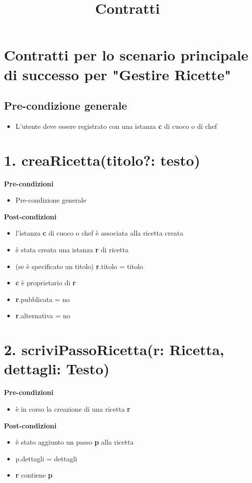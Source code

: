 \documentclass[12pt]{extarticle}
\begin{document}
\title{Contratti}
\date{}
\maketitle

\section*{Contratti per lo scenario principale di successo per "Gestire Ricette"}

\subsection*{Pre-condizione generale}
\begin{itemize}
  \item L'utente deve essere registrato con una istanza \textbf{c} di cuoco o di chef
\end{itemize}

\section*{1. creaRicetta(titolo?: testo)}
\textbf{Pre-condizioni}
\begin{itemize}
  \item Pre-condizione generale
\end{itemize}
\textbf{Post-condizioni}
\begin{itemize}
  \item l'istanza \textbf{c} di cuoco o chef è associata alla ricetta creata
  \item è stata creata una istanza \textbf{r} di ricetta
  \item (se è specificato un titolo) \textbf{r}.titolo = titolo
  \item \textbf{c} è proprietario di \textbf{r}
  \item \textbf{r}.pubblicata = no
  \item \textbf{r}.alternativa = no
\end{itemize}

\section*{2. scriviPassoRicetta(r: Ricetta, dettagli: Testo)}

\textbf{Pre-condizioni} 	
\begin{itemize}
  \item è in corso la creazione di una ricetta  \textbf{r}
\end{itemize}
\textbf{Post-condizioni}
\begin{itemize}
  \item è stato aggiunto un passo  \textbf{p} alla ricetta
  \item p.dettagli = dettagli
  \item  \textbf{r} contiene  \textbf{p}
\end{itemize}
\end{document}
